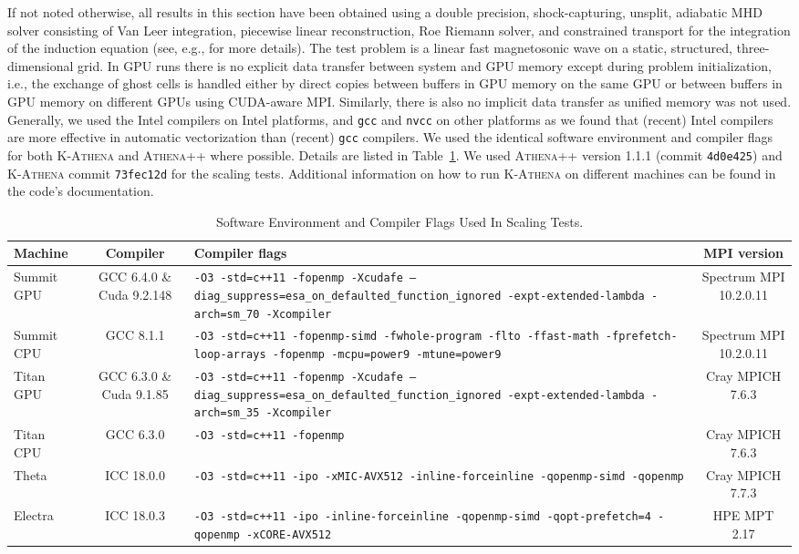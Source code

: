\documentclass[10pt,journal,compsoc]{IEEEtran}
\newcommand{\textcode}[1]{\textsc{#1}}
\newcommand{\athena}{\textcode{Athena++}\xspace}
\newcommand{\kathena}{\textcode{K-Athena}\xspace}
\newcommand{\cuda}{\textcode{CUDA}\xspace}
\newcommand{\mpi}{\textcode{MPI}\xspace}
\begin{document}
If not noted otherwise, all results in this section have been obtained using
a double precision, shock-capturing, unsplit, adiabatic MHD solver consisting 
of Van Leer integration,
piecewise linear reconstruction, Roe Riemann solver, and constrained transport for the 
integration of the induction equation (see, e.g., \cite{Stone2009} for more details).
The test problem is a linear fast magnetosonic wave on a static, structured,
three-dimensional grid.
In GPU runs there is no explicit data transfer between system and GPU memory except
during problem initialization, i.e., the exchange of ghost cells is handled either
by direct copies between buffers in GPU memory on the same GPU or between buffers in
GPU memory on different GPUs using \cuda-aware \mpi.
Similarly, there is also no implicit data transfer as unified memory was not used.
Generally, we used the Intel compilers on Intel platforms, and \texttt{gcc}  and 
\texttt{nvcc} on other platforms as we found that (recent) Intel compilers are
more effective in automatic vectorization than (recent) \texttt{gcc} compilers.
We used the identical software environment and compiler flags
for both \kathena and \athena where possible.
Details are listed in Table~\ref{tab:compiler}.
We used \athena version 1.1.1 (commit \texttt{4d0e425}) and \kathena commit 
\texttt{73fec12d} for the scaling tests.
Additional information on how to run \kathena on different machines can be found in
the code's documentation.
\begin{table}[!t]
\renewcommand{\arraystretch}{1.3}
\caption{Software Environment and Compiler Flags Used In Scaling Tests.}
\label{tab:compiler}
\centering
\begin{tabular}{l c p{8cm} c}
\hline
\bfseries Machine & \bfseries Compiler & \bfseries Compiler flags & \bfseries \mpi version\\
\hline
Summit GPU & GCC 6.4.0 \& Cuda 9.2.148 & 
\texttt{-O3 -std=c++11 -fopenmp -Xcudafe --diag\_suppress=esa\_on\_defaulted\_function\_ignored -expt-extended-lambda -arch=sm\_70 -Xcompiler}
& Spectrum MPI 10.2.0.11 \\
Summit CPU & GCC 8.1.1  & 
\texttt{-O3 -std=c++11 -fopenmp-simd -fwhole-program -flto -ffast-math -fprefetch-loop-arrays -fopenmp -mcpu=power9 -mtune=power9}
& Spectrum MPI 10.2.0.11 \\
Titan GPU & GCC 6.3.0 \& Cuda 9.1.85 &
\texttt{-O3 -std=c++11 -fopenmp -Xcudafe --diag\_suppress=esa\_on\_defaulted\_function\_ignored -expt-extended-lambda -arch=sm\_35 -Xcompiler}
& Cray MPICH 7.6.3 \\
Titan CPU & GCC 6.3.0 & 
\texttt{-O3 -std=c++11 -fopenmp}
& Cray MPICH 7.6.3 \\
Theta & ICC 18.0.0 &
\texttt{-O3 -std=c++11 -ipo -xMIC-AVX512 -inline-forceinline -qopenmp-simd -qopenmp}
& Cray MPICH 7.7.3\\
Electra & ICC 18.0.3 &
\texttt{-O3 -std=c++11 -ipo -inline-forceinline -qopenmp-simd -qopt-prefetch=4 -qopenmp -xCORE-AVX512}
& HPE MPT 2.17\\
\hline
\end{tabular}
\end{table}
\end{document}
